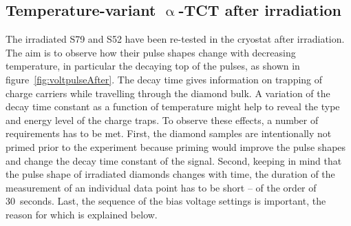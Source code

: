 \subsection{Temperature-variant $\upalpha$-TCT after irradiation}
\label{sec:afterirrad}
The irradiated S79 and S52 have been re-tested in the cryostat after irradiation. The aim is to observe how their pulse shapes change with decreasing temperature, in particular the decaying top of the pulses, as shown in figure~\ref{fig:voltpulseAfter}. The decay time gives information on trapping of charge carriers while travelling through the diamond bulk. A variation of the decay time constant as a function of temperature might help to reveal the type and energy level of the charge traps. To observe these effects, a number of requirements has to be met. First, the diamond samples are intentionally not primed prior to the experiment because priming would improve the pulse shapes and change the decay time constant of the signal. Second, keeping in mind that the pulse shape of irradiated diamonds changes with time, the duration of the measurement of an individual data point has to be short -- of the order of 30~seconds. Last, the sequence of the bias voltage settings is important, the reason for which is explained below.
